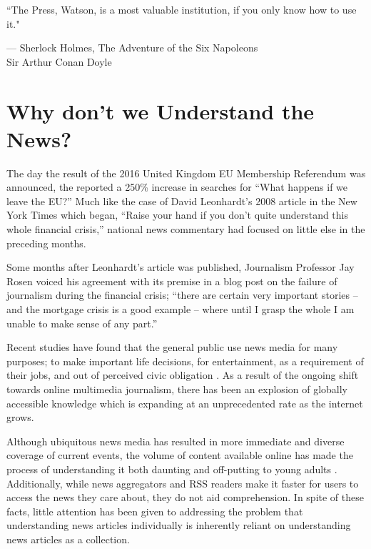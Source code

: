 \vspace{-0.5cm}
\epigraph{``The Press, Watson, is a most valuable institution, if you only know how to use it."}{--- \textup{Sherlock Holmes}, The Adventure of the Six Napoleons\\[0.2cm] \textup{Sir Arthur Conan Doyle}}

\section*{Why don't we Understand the News?}

The day the result of the 2016 United Kingdom EU Membership Referendum was announced, the \citeauthor{googletrends} reported a 250\% increase in searches for ``What happens if we leave the EU?'' Much like the case of David Leonhardt's 2008 article in the New York Times which began, ``Raise your hand if you don't quite understand this whole financial crisis,'' national news commentary had focused on little else in the preceding months.

Some months after Leonhardt's article was published, Journalism Professor Jay Rosen voiced his agreement with its premise in a blog post on the failure of journalism during the financial crisis; ``there are certain very important stories -- and the mortgage crisis is a good example -- where until I grasp the whole I am unable to make sense of any part.''\citep{NationalExplainer}

Recent studies have found that the general public use news media for many purposes; to make important life decisions, for entertainment, as a requirement of their jobs, and out of perceived civic obligation \citep{InformationCartography,UnderstandingTheParticipatoryNewsConsumer}. As a result of the ongoing shift towards online multimedia journalism, there has been an explosion of globally accessible knowledge which is expanding at an unprecedented rate as the internet grows. 

Although ubiquitous news media has resulted in more immediate and diverse coverage of current events, the volume of content available online has made the process of understanding it both daunting and off-putting to young adults \citep{anewmodelfornews}. Additionally, while news aggregators and RSS readers make it faster for users to access the news they care about, they do not aid comprehension. In spite of these facts, little attention has been given to addressing the problem that understanding news articles individually is inherently reliant on understanding news articles as a collection. 

